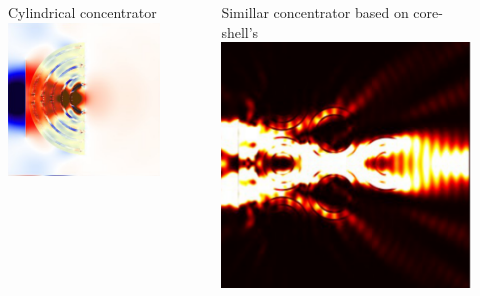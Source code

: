 \documentclass{beamer}
\begin{document}
\begin{frame}
	\begin{columns}
		\begin{column}{0.5\textwidth}
			\begin{figure}
				Cylindrical concentrator
				\includegraphics[width=\textwidth]{../images/multilayer/konc_polk_poynt.png}\\
			\end{figure}
		\end{column}
		\begin{column}{0.5\textwidth}
				Simillar concentrator based on core-shell's
				\includegraphics[width=\textwidth]{../images/multilayer/konc_coreshell_energy.png}\\
		\end{column}
	\end{columns}
		

\end{frame}
\end{document}
